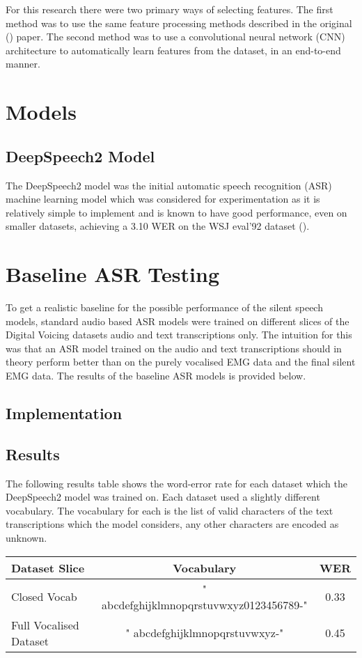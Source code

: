 For this research there were two primary ways of selecting features. The first method
was to use the same feature processing methods described in the original
(\cite{gaddy2020digital}) paper. The second method was to use a convolutional
neural network (CNN) architecture to automatically learn features from the
dataset, in an end-to-end manner.

\section{Models}

\subsection{DeepSpeech2 Model}

The DeepSpeech2 model was the initial automatic speech recognition (ASR) machine
learning model which was considered for experimentation as it is relatively simple to
implement and is known to have good performance, even on smaller datasets, achieving
a 3.10 WER on the WSJ eval'92 dataset
(\cite{DS2_original}).

\section{Baseline ASR Testing}

To get a realistic baseline for the possible performance of the silent
speech models, standard audio based ASR models were trained on different
slices of the Digital Voicing datasets audio and text transcriptions only.
The intuition for this was that an ASR model trained on the audio and text
transcriptions should in theory perform better than on the purely vocalised
EMG data and the final silent EMG data. The results of the baseline ASR models
is provided below.

\subsection{Implementation}

\subsection{Results}

The following results table shows the word-error rate for each dataset
which the DeepSpeech2 model was trained on. Each dataset used a slightly
different vocabulary. The vocabulary for each is the list of valid characters
of the text transcriptions which the model considers, any other characters
are encoded as unknown.

\begin{center}
\begin{tabular} { | l | c | c | }
Dataset Slice & Vocabulary & WER \\
\hline
Closed Vocab & " abcdefghijklmnopqrstuvwxyz0123456789-" & 0.33 \\
Full Vocalised Dataset & " abcdefghijklmnopqrstuvwxyz-" & 0.45
\end{tabular}
\end{center}